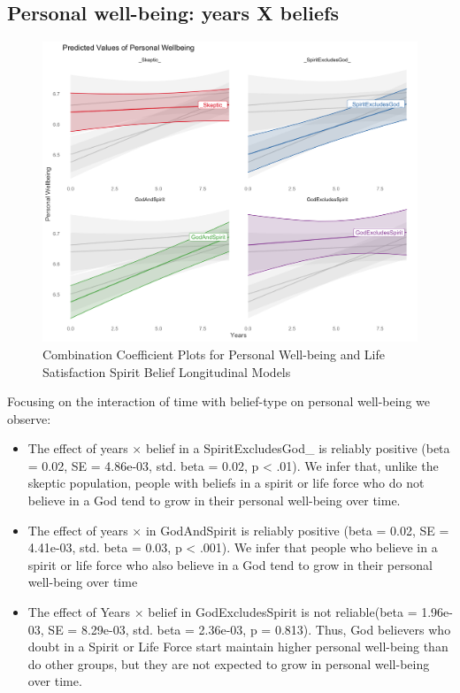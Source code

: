 \documentclass[
  english,
  man]{apa6}
\providecommand{\tightlist}{%
  \setlength{\itemsep}{0pt}\setlength{\parskip}{0pt}}
\begin{document}
\hypertarget{personal-well-being-years-x-beliefs}{%
\subsection{Personal well-being: years X beliefs}\label{personal-well-being-years-x-beliefs}}

\begin{figure}
\includegraphics[width=6.4in]{Figs/USEPWI_expected-1} \caption{Combination Coefficient Plots for Personal Well-being and Life Satisfaction Spirit Belief Longitudinal Models}\label{fig:unnamed-chunk-2}
\end{figure}

Focusing on the interaction of time with belief-type on personal well-being we observe:

\begin{itemize}
\tightlist
\item
  The effect of years \(\times\) belief in a SpiritExcludesGod\_ is reliably positive (beta = 0.02, SE = 4.86e-03, std. beta = 0.02, p \textless{} .01). We infer that, unlike the skeptic population, people with beliefs in a spirit or life force who do not believe in a God tend to grow in their personal well-being over time.
\item
  The effect of years \(\times\) in GodAndSpirit is reliably positive (beta = 0.02, SE = 4.41e-03, std. beta = 0.03, p \textless{} .001). We infer that people who believe in a spirit or life force who also believe in a God tend to grow in their personal well-being over time
\item
  The effect of Years \(\times\) belief in GodExcludesSpirit is not reliable(beta = 1.96e-03, SE = 8.29e-03, std. beta = 2.36e-03, p = 0.813). Thus, God believers who doubt in a Spirit or Life Force start maintain higher personal well-being than do other groups, but they are not expected to grow in personal well-being over time.
\end{itemize}
\end{document}
